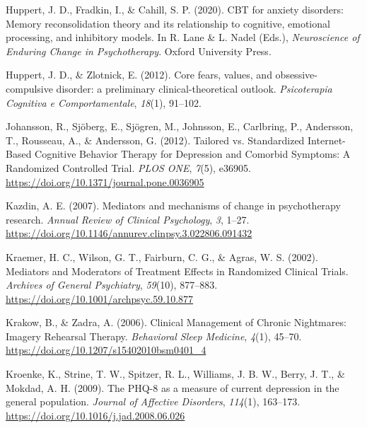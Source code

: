 \documentclass[
  man,floatsintext]{apa7}
\newlength{\cslhangindent}
\newlength{\cslentryspacingunit} %
\newenvironment{CSLReferences}[2] %
 {%
  \setlength{\parindent}{0pt}
  \ifodd #1
  \let\oldpar\par
  \def\par{\hangindent=\cslhangindent\oldpar}
  \fi
  \setlength{\parskip}{#2\cslentryspacingunit}
 }%
 {}
\begin{document}
\begin{CSLReferences}{1}{0}
\leavevmode{}%
Huppert, J. D., Fradkin, I., \& Cahill, S. P. (2020). CBT for anxiety disorders: Memory reconsolidation theory and its relationship to cognitive, emotional processing, and inhibitory models. In R. Lane \& L. Nadel (Eds.), \emph{Neuroscience of Enduring Change in Psychotherapy}. Oxford University Press.

\leavevmode{}%
Huppert, J. D., \& Zlotnick, E. (2012). Core fears, values, and obsessive-compulsive disorder: a preliminary clinical-theoretical outlook. \emph{Psicoterapia Cognitiva e Comportamentale}, \emph{18}(1), 91--102.

\leavevmode{}%
Johansson, R., Sjöberg, E., Sjögren, M., Johnsson, E., Carlbring, P., Andersson, T., Rousseau, A., \& Andersson, G. (2012). Tailored vs. Standardized Internet-Based Cognitive Behavior Therapy for Depression and Comorbid Symptoms: A Randomized Controlled Trial. \emph{PLOS ONE}, \emph{7}(5), e36905. \url{https://doi.org/10.1371/journal.pone.0036905}

\leavevmode{}%
Kazdin, A. E. (2007). Mediators and mechanisms of change in psychotherapy research. \emph{Annual Review of Clinical Psychology}, \emph{3}, 1--27. \url{https://doi.org/10.1146/annurev.clinpsy.3.022806.091432}

\leavevmode{}%
Kraemer, H. C., Wilson, G. T., Fairburn, C. G., \& Agras, W. S. (2002). Mediators and Moderators of Treatment Effects in Randomized Clinical Trials. \emph{Archives of General Psychiatry}, \emph{59}(10), 877--883. \url{https://doi.org/10.1001/archpsyc.59.10.877}

\leavevmode{}%
Krakow, B., \& Zadra, A. (2006). Clinical Management of Chronic Nightmares: Imagery Rehearsal Therapy. \emph{Behavioral Sleep Medicine}, \emph{4}(1), 45--70. \url{https://doi.org/10.1207/s15402010bsm0401_4}

\leavevmode{}%
Kroenke, K., Strine, T. W., Spitzer, R. L., Williams, J. B. W., Berry, J. T., \& Mokdad, A. H. (2009). The PHQ-8 as a measure of current depression in the general population. \emph{Journal of Affective Disorders}, \emph{114}(1), 163--173. \url{https://doi.org/10.1016/j.jad.2008.06.026}


\end{CSLReferences}
\end{document}
